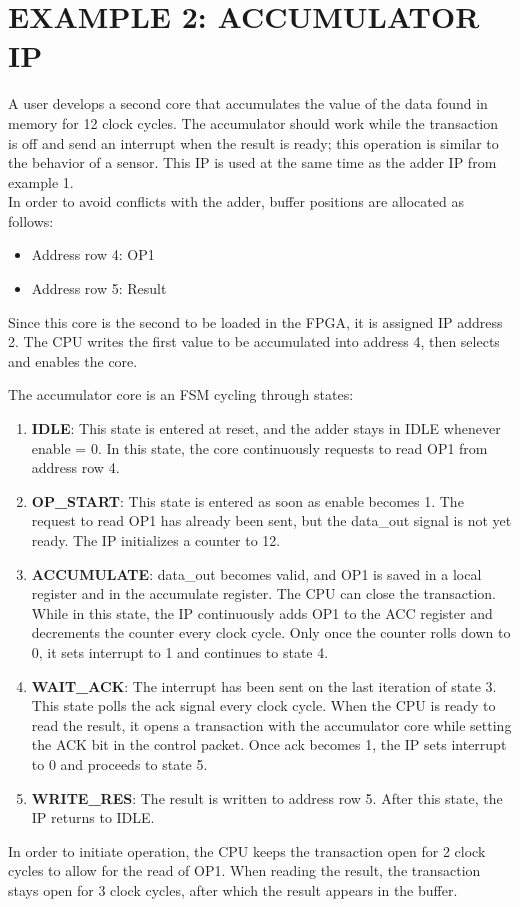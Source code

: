 \section{EXAMPLE 2: ACCUMULATOR IP}

A user develops a second core that accumulates the value of the data found in memory for 12 clock cycles. The accumulator should work while the transaction is off and send an interrupt when the result is ready; this operation is similar to the behavior of a sensor. This IP is used at the same time as the adder IP from example 1.\\
In order to avoid conflicts with the adder, buffer positions are allocated as follows:

\begin{itemize}
\item Address row 4: OP1 
\item Address row 5: Result
\end{itemize}


Since this core is the second to be loaded in the FPGA, it is assigned IP address 2. The CPU writes the first value to be accumulated into address 4, then selects and enables the core. \\
\bigskip

The accumulator core is an FSM cycling through states:
\begin{enumerate}

\item \textbf{IDLE}: This state is entered at reset, and the adder stays in IDLE whenever enable = 0. In this state, the core continuously requests to read OP1 from address row 4.

\item \textbf{OP\_START}: This state is entered as soon as enable becomes 1. The request to read OP1 has already been sent, but the data\_out signal is not yet ready. The IP initializes a counter to 12. 

\item \textbf{ACCUMULATE}: data\_out becomes valid, and OP1 is saved in a local register and in the accumulate register. The CPU can close the transaction.
While in this state, the IP continuously adds OP1 to the ACC register and decrements the counter every clock cycle. Only once the counter rolls down to 0, it sets interrupt to 1 and continues to state 4.

\item \textbf{WAIT\_ACK}: The interrupt has been sent on the last iteration of state 3. This state polls the ack signal every clock cycle. 
When the CPU is ready to read the result, it opens a transaction with the accumulator core while setting the ACK bit in the control packet. Once ack becomes 1, the IP sets interrupt to 0 and proceeds to state 5.

\item\textbf{ WRITE\_RES}: The result is written to address row 5. After this state, the IP returns to IDLE.

\end{enumerate}
In order to initiate operation, the CPU keeps the transaction open for 2 clock cycles to allow for the read of OP1. When reading the result, the transaction stays open for 3 clock cycles, after which the result appears in the buffer.